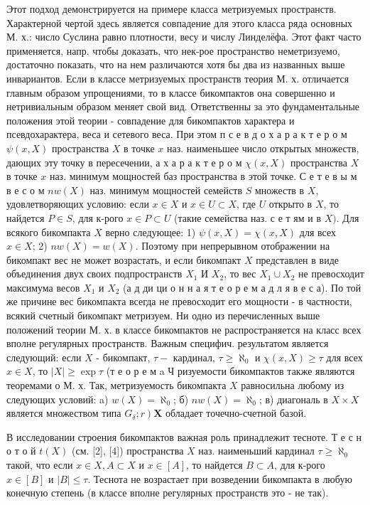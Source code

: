 \documentclass[10pt]{article}
\begin{document}
Этот подход демонстрируется на примере класса метризуемых пространств. Характерной чертой здесь является совпадение для этого класса ряда основных М. х.: число Суслина равно плотности, весу и числу Линделёфа. Этот факт часто применяется, напр. чтобы доказать, что нек-рое пространство неметризуемо, достаточно показать, что на нем различаются хотя бы два из названных выше инвариантов. Если в классе метризуемых пространств теория М. х. отличается главным образом упрощениями, то в классе бикомпактов она совершенно и нетривиальным образом меняет свой вид. Ответственны за это фундаментальные положения этой теории - совпадение для бикомпактов характера и псевдохарактера, веса и сетевого веса. При этом п с е в д о х а р а к т е р о м $\psi(x, X)$ пространства $X$ в точке $x$ наз. наименьшее число открытых множеств, дающих эту точку в пересечении, а х а р а к т е р о м $\chi(x, X)$ пространства $X$ в точке $x$ наз. минимум мощностей баз пространства в этой точке. С е т е в ы $м$ в е с о м $n w(X)$ наз. минимум мощностей семейств $S$ множеств в $X$, удовлетворяющих условию: если $x \in X$ и $x \in U \subset X$, где $U$ открыто в $X$, то найдется $P \in S$, для к-рого $x \in P \subset U$ (такие семейства наз. с е т ям и в $X)$. Для всякого бикомпакта $X$ верно следующее: 1) $\psi(x, X)=\chi(x, X)$ для всех $x \in X$; 2) $n w(X)=w(X)$. Поэтому при непрерывном отображении на бикомпакт вес не может возрастать, и если бикомпакт $X$ представлен в виде объединения двух своих подпространств $X_{1}$ И $X_{2}$, то вес $X_{1} \cup X_{2}$ не превосходит максимума весов $X_{1}$ и $X_{2}$ (а д ди ци о н н а я т е о р е м а д л я в е с а). По той же причине вес бикомпакта всегда не превосходит его мощности - в частности, всякий счетный бикомпакт метризуем. Ни одно из перечисленных выше положений теории М. х. в классе бикомпактов не распространяется на класс всех вполне регулярных пространств. Важным специфич. результатом является следующий: если $X$ - бикомпакт, $\tau-$ кардинал, $\tau \geqslant \aleph_{0}$ и $\chi(x, X) \geqslant \tau$ для всех $x \in X$, то $|X| \geqslant \exp \tau$ (т е о р е м a Ч ризуемости бикомпактов также являются теоремами о М. х. Так, метризуемость бикомпакта $X$ равносильна любому из следующих условий: a) $w(X)=\aleph_{0}$; б) $n w(X)=\aleph_{0}$; в) диагональ в $X \times X$ является множеством типа $\left.G_{\delta} ; r\right) \boldsymbol{X}$ обладает точечно-счетной базой.



В исследовании строения бикомпактов важная роль принадлежит тесноте. Т е с н о т о й $t(X)$ (см. [2], [4]) пространства $X$ наз. наименьший кардинал $\tau \geqslant \aleph_{0}$ такой, что если $x \in X, A \subset X$ и $x \in[A]$, то найдется $B \subset A$, для к-рого $x \in[B]$ и $|B| \leqslant \tau$. Теснота не возрастает при возведении бикомпакта в любую конечную степень (в классе вполне регулярных пространств это - не так).
\end{document}
